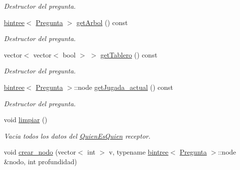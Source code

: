 \begin{DoxyCompactItemize}
\begin{DoxyCompactList}\small\item\em Destructor del pregunta. \end{DoxyCompactList}\item 
\hyperlink{classbintree}{bintree}$<$ \hyperlink{classPregunta}{Pregunta} $>$ \hyperlink{classQuienEsQuien_afc2abfa00aefb33c5020e9f4ae71aaa9}{get\+Arbol} () const \hypertarget{classQuienEsQuien_afc2abfa00aefb33c5020e9f4ae71aaa9}{}\label{classQuienEsQuien_afc2abfa00aefb33c5020e9f4ae71aaa9}

\begin{DoxyCompactList}\small\item\em Destructor del pregunta. \end{DoxyCompactList}\item 
vector$<$ vector$<$ bool $>$ $>$ \hyperlink{classQuienEsQuien_a9b2a3b798f17f2d1be05847ac9d6ad92}{get\+Tablero} () const \hypertarget{classQuienEsQuien_a9b2a3b798f17f2d1be05847ac9d6ad92}{}\label{classQuienEsQuien_a9b2a3b798f17f2d1be05847ac9d6ad92}

\begin{DoxyCompactList}\small\item\em Destructor del pregunta. \end{DoxyCompactList}\item 
\hyperlink{classbintree}{bintree}$<$ \hyperlink{classPregunta}{Pregunta} $>$\+::node \hyperlink{classQuienEsQuien_a06390bb93b1371e7fdbae0613e56bedb}{get\+Jugada\+\_\+actual} () const \hypertarget{classQuienEsQuien_a06390bb93b1371e7fdbae0613e56bedb}{}\label{classQuienEsQuien_a06390bb93b1371e7fdbae0613e56bedb}

\begin{DoxyCompactList}\small\item\em Destructor del pregunta. \end{DoxyCompactList}\item 
void \hyperlink{classQuienEsQuien_a17703bc3277c2846fa67f857894366cd}{limpiar} ()\hypertarget{classQuienEsQuien_a17703bc3277c2846fa67f857894366cd}{}\label{classQuienEsQuien_a17703bc3277c2846fa67f857894366cd}

\begin{DoxyCompactList}\small\item\em Vacia todos los datos del \hyperlink{classQuienEsQuien}{Quien\+Es\+Quien} receptor. \end{DoxyCompactList}\item 
void \hyperlink{classQuienEsQuien_a8dbd32b3f42489cdb8d283a6e4c68c36}{crear\+\_\+nodo} (vector$<$ int $>$ v, typename \hyperlink{classbintree}{bintree}$<$ \hyperlink{classPregunta}{Pregunta} $>$\+::node \&nodo, int profundidad)\hypertarget{classQuienEsQuien_a8dbd32b3f42489cdb8d283a6e4c68c36}{}\label{classQuienEsQuien_a8dbd32b3f42489cdb8d283a6e4c68c36}


\end{DoxyCompactItemize}
